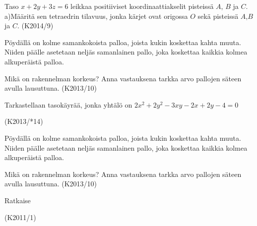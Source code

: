 \begin{tehtava}
Taso $x+2y+3z=6$ leikkaa positiiviset koordinaattiakselit pisteissä $A$, $B$ ja $C$.
a)Määritä sen tetraedrin tilavuus, jonka kärjet ovat origossa $O$ sekä pisteissä $A$,$B$ ja $C$. (K2014/9)
\end{tehtava}


\begin{tehtava}
Pöydällä on kolme samankokoista palloa, joista kukin koskettaa kahta muuta. Niiden päälle asetetaan neljäs samanlainen  pallo, joka koskettaa kaikkia kolmea alkuperäistä palloa.

Mikä on rakennelman korkeus? Anna vastauksena tarkka arvo pallojen säteen avulla lausuttuna. (K2013/10)
\end{tehtava}


\begin{tehtava}
Tarkastellaan tasokäyrää, jonka yhtälö on $2x^2+2y^2-3xy-2x+2y-4=0$
\begin{alakohdat}
	\end{alakohdat}
 (K2013/*14)
\end{tehtava}


\begin{tehtava}
Pöydällä on kolme samankokoista palloa, joista kukin koskettaa kahta muuta. Niiden päälle asetetaan neljäs samanlainen  pallo, joka koskettaa kaikkia kolmea alkuperäistä palloa.

Mikä on rakennelman korkeus? Anna vastauksena tarkka arvo pallojen säteen avulla lausuttuna. (K2013/10)
\end{tehtava}


\begin{tehtava} Ratkaise
\begin{alakohdat}
	\end{alakohdat}
	(K2011/1)
\end{tehtava}


